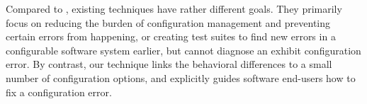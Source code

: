 Compared to \ourtool, existing techniques have rather different
goals. They primarily focus on reducing the burden of
configuration management and preventing certain errors from
happening, or creating test suites to find new errors in
a configurable software system earlier, but cannot
diagnose an exhibit configuration error. By contrast, our \ourtool technique
links the behavioral differences to a small number
of configuration options, and explicitly guides software end-users
how to fix a configuration error.







